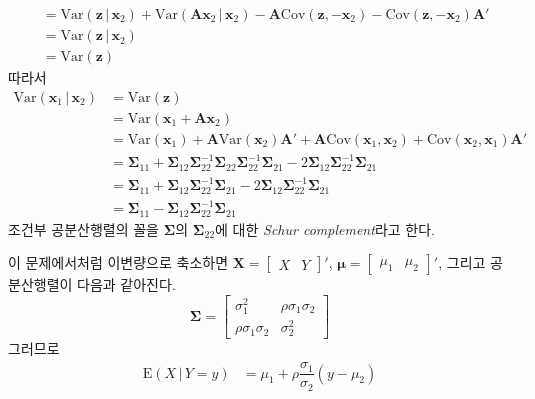 \documentclass[answers]{exam}
\newcommand{\bs}{\boldsymbol}
\begin{document}
\begin{questions}
\begin{solution}
\begin{enumerate}[(a)]
\begin{align}
        &= \mathrm{Var}\left(\mathbf{z}\,|\,\mathbf{x}_{2}\right)+\mathrm{Var}\left(\mathbf{Ax}_{2}\,|\,\mathbf{x}_{2}\right)-\mathbf{A}\mathrm{Cov}\left(\mathbf{z},-\mathbf{x}_{2}\right)-\mathrm{Cov}\left(\mathbf{z},-\mathbf{x}_{2}\right)\mathbf{A}'\\
        &= \mathrm{Var}\left(\mathbf{z}\,|\,\mathbf{x}_{2}\right)\\
        &= \mathrm{Var}\left(\mathbf{z}\right)
      \end{align}
      따라서
      \begin{align}
        \mathrm{Var}\left(\mathbf{x}_{1}\,|\,\mathbf{x}_{2}\right) &= \mathrm{Var}\left(\mathbf{z}\right)\\
        &=\mathrm{Var}\left(\mathbf{x}_{1}+\mathbf{Ax}_{2}\right)\\
        &=\mathrm{Var}\left(\mathbf{x}_{1}\right)+\mathbf{A}\mathrm{Var}\left(\mathbf{x}_{2}\right)\mathbf{A}'+\mathbf{A}\mathrm{Cov}\left(\mathbf{x}_{1},\mathbf{x}_{2}\right)+\mathrm{Cov}\left(\mathbf{x}_{2},\mathbf{x}_{1}\right)\mathbf{A}'\\
        &= \bs{\Sigma}_{11}+\bs{\Sigma}_{12}\bs{\Sigma}_{22}^{-1}\bs{\Sigma}_{22}\bs{\Sigma}_{22}^{-1}\bs{\Sigma}_{21}-2\bs{\Sigma}_{12}\bs{\Sigma}_{22}^{-1}\bs{\Sigma}_{21}\\
        &= \bs{\Sigma}_{11}+\bs{\Sigma}_{12}\bs{\Sigma}_{22}^{-1}\bs{\Sigma}_{21}-2\bs{\Sigma}_{12}\bs{\Sigma}_{22}^{-1}\bs{\Sigma}_{21}\\
        &=\bs{\Sigma}_{11}-\bs{\Sigma}_{12}\bs{\Sigma}_{22}^{-1}\bs{\Sigma}_{21}
      \end{align}
      조건부 공분산행렬의 꼴을 $\bs{\Sigma}$의 $\bs{\Sigma}_{22}$에 대한 \emph{Schur complement}라고 한다.\par
      이 문제에서처럼 이변량으로 축소하면 $\mathbf{X}=\begin{bmatrix}X&Y\end{bmatrix}'$, $\bs{\mu}=\begin{bmatrix}\mu_{1}&\mu_{2}\end{bmatrix}'$, 그리고 공분산행렬이 다음과 같아진다.
      \begin{equation}
        \bs{\Sigma} = \begin{bmatrix}\sigma_{1}^{2}&\rho\sigma_{1}\sigma_{2}\\\rho\sigma_{1}\sigma_{2}&\sigma_{2}^{2}\end{bmatrix}
      \end{equation}
      그러므로
      \begin{align}
        \mathrm{E}\left(X\,|\,Y=y\right) &= \mu_{1}+\rho\dfrac{\sigma_{1}}{\sigma_{2}}\left(y-\mu_{2}\right)\\

\end{align}
\end{enumerate}
\end{solution}
\end{questions}
\end{document}
